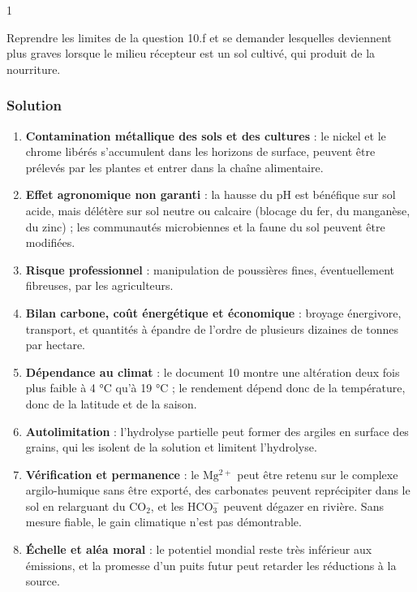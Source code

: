 \documentclass[11pt,a4paper]{article}
\providecommand{\tightlist}{\setlength{\itemsep}{0pt}\setlength{\parskip}{0pt}}
\begin{document}
\begin{indication}{1}

Reprendre les limites de la question 10.f et se demander lesquelles deviennent plus graves lorsque le milieu récepteur est un sol cultivé, qui produit de la nourriture.

\end{indication}

\hypertarget{solution-40}{%
\subsubsection{Solution}\label{solution-40}}

\begin{enumerate}
\def\labelenumi{\arabic{enumi}.}
\tightlist
\item
  \textbf{Contamination métallique des sols et des cultures} : le nickel et le chrome libérés s'accumulent dans les horizons de surface, peuvent être prélevés par les plantes et entrer dans la chaîne alimentaire.
\item
  \textbf{Effet agronomique non garanti} : la hausse du pH est bénéfique sur sol acide, mais délétère sur sol neutre ou calcaire (blocage du fer, du manganèse, du zinc) ; les communautés microbiennes et la faune du sol peuvent être modifiées.
\item
  \textbf{Risque professionnel} : manipulation de poussières fines, éventuellement fibreuses, par les agriculteurs.
\item
  \textbf{Bilan carbone, coût énergétique et économique} : broyage énergivore, transport, et quantités à épandre de l'ordre de plusieurs dizaines de tonnes par hectare.
\item
  \textbf{Dépendance au climat} : le document 10 montre une altération deux fois plus faible à 4 °C qu'à 19 °C ; le rendement dépend donc de la température, donc de la latitude et de la saison.
\item
  \textbf{Autolimitation} : l'hydrolyse partielle peut former des argiles en surface des grains, qui les isolent de la solution et limitent l'hydrolyse.
\item
  \textbf{Vérification et permanence} : le \(\mathrm{Mg^{2+}}\) peut être retenu sur le complexe argilo-humique sans être exporté, des carbonates peuvent reprécipiter dans le sol en relarguant du \(\mathrm{CO_2}\), et les \(\mathrm{HCO_3^-}\) peuvent dégazer en rivière. Sans mesure fiable, le gain climatique n'est pas démontrable.
\item
  \textbf{Échelle et aléa moral} : le potentiel mondial reste très inférieur aux émissions, et la promesse d'un puits futur peut retarder les réductions à la source.
\end{enumerate}
\end{document}
